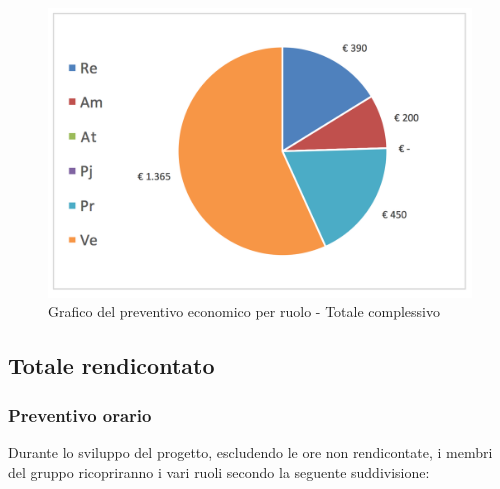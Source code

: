 			\begin{figure}[H]
			\centering
			\includegraphics[scale=0.40]{img/s_Totale}
			\caption{Grafico del preventivo economico per ruolo - Totale complessivo}
			\label{fig:Totale complessivo economico}
			\end{figure}
		\newpage
		\subsection {Totale rendicontato}
				\subsubsection {Preventivo orario}
                Durante lo sviluppo del progetto, escludendo le ore non rendicontate, i membri del gruppo ricopriranno i vari ruoli secondo la seguente suddivisione:\\

